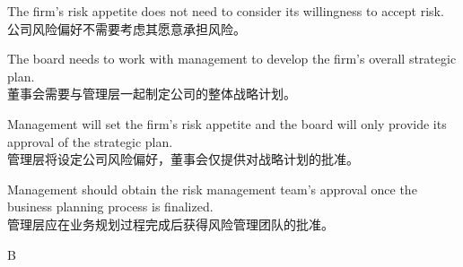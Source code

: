 \documentclass{article}
\begin{document}
    \begin{choices}
    \item The firm's risk appetite does not need to consider its willingness to accept risk. \\
    公司风险偏好不需要考虑其愿意承担风险。
    
    \item The board needs to work with management to develop the firm's overall strategic plan. \\
    董事会需要与管理层一起制定公司的整体战略计划。
    
    \item Management will set the firm's risk appetite and the board will only provide its approval of the strategic plan. \\
    管理层将设定公司风险偏好，董事会仅提供对战略计划的批准。
    
    \item Management should obtain the risk management team's approval once the business planning process is finalized. \\
    管理层应在业务规划过程完成后获得风险管理团队的批准。
    \end{choices}
    
    \begin{correctanswer}
    B
    \end{correctanswer}
    
\end{document}
